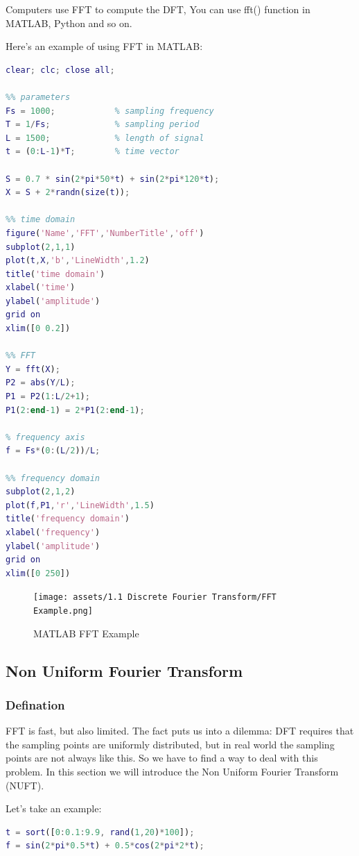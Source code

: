 \documentclass[12pt]{ctexart}
\begin{document}
Computers use FFT to compute the DFT, You can use fft() function in MATLAB, Python and
so on.

Here's an example of using FFT in MATLAB:
\begin{lstlisting}[language=Matlab]
%% FFT_example
clear; clc; close all;

%% parameters
Fs = 1000;            % sampling frequency
T = 1/Fs;             % sampling period
L = 1500;             % length of signal
t = (0:L-1)*T;        % time vector

S = 0.7 * sin(2*pi*50*t) + sin(2*pi*120*t);
X = S + 2*randn(size(t));

%% time domain
figure('Name','FFT','NumberTitle','off')
subplot(2,1,1)
plot(t,X,'b','LineWidth',1.2)
title('time domain')
xlabel('time')
ylabel('amplitude')
grid on
xlim([0 0.2])

%% FFT
Y = fft(X);
P2 = abs(Y/L);
P1 = P2(1:L/2+1);
P1(2:end-1) = 2*P1(2:end-1);

% frequency axis
f = Fs*(0:(L/2))/L;

%% frequency domain
subplot(2,1,2)
plot(f,P1,'r','LineWidth',1.5)
title('frequency domain')
xlabel('frequency')
ylabel('amplitude')
grid on
xlim([0 250])

\end{lstlisting}

\begin{figure}[H]
  \centering
  \texttt{[image: assets/1.1 Discrete Fourier Transform/FFT
  Example.png]}
  \caption{MATLAB FFT Example}
\end{figure}

\subsection{\textbf{Non Uniform Fourier Transform}}

\subsubsection{\textbf{Defination}}

FFT is fast, but also limited. The fact puts us into a dilemma: DFT requires that the
sampling points are uniformly distributed, but in real world the sampling points are not
always like this. So we have to find a way to deal with this problem. In this section we
will introduce the Non Uniform Fourier Transform (NUFT).

Let's take an example:

\begin{lstlisting}[language=Matlab]
t = sort([0:0.1:9.9, rand(1,20)*100]);
f = sin(2*pi*0.5*t) + 0.5*cos(2*pi*2*t);
\end{lstlisting}
\end{document}
